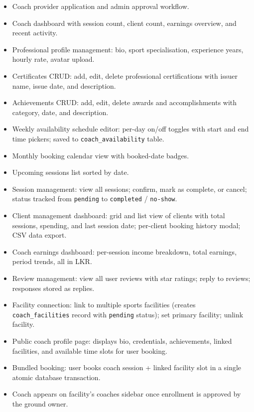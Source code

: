 \documentclass[12pt,a4paper]{report}
\begin{document}
\begin{itemize}[leftmargin=1.5cm]
  \item Coach provider application and admin approval workflow.
  \item Coach dashboard with session count, client count, earnings overview, and recent activity.
  \item Professional profile management: bio, sport specialisation, experience years, hourly rate, avatar upload.
  \item Certificates CRUD: add, edit, delete professional certifications with issuer name, issue date, and description.
  \item Achievements CRUD: add, edit, delete awards and accomplishments with category, date, and description.
  \item Weekly availability schedule editor: per-day on/off toggles with start and end time pickers; saved to \texttt{coach\_availability} table.
  \item Monthly booking calendar view with booked-date badges.
  \item Upcoming sessions list sorted by date.
  \item Session management: view all sessions; confirm, mark as complete, or cancel; status tracked from \texttt{pending} to \texttt{completed} / \texttt{no-show}.
  \item Client management dashboard: grid and list view of clients with total sessions, spending, and last session date; per-client booking history modal; CSV data export.
  \item Coach earnings dashboard: per-session income breakdown, total earnings, period trends, all in LKR.
  \item Review management: view all user reviews with star ratings; reply to reviews; responses stored as replies.
  \item Facility connection: link to multiple sports facilities (creates \texttt{coach\_facilities} record with \texttt{pending} status); set primary facility; unlink facility.
  \item Public coach profile page: displays bio, credentials, achievements, linked facilities, and available time slots for user booking.
  \item Bundled booking: user books coach session + linked facility slot in a single atomic database transaction.
  \item Coach appears on facility's coaches sidebar once enrollment is approved by the ground owner.
\end{itemize}
\end{document}
